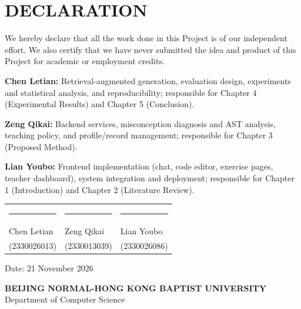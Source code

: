 \hypersetup{pageanchor=true}

\chapter*{DECLARATION}
{}

We hereby declare that all the work done in this Project is of our independent effort. We also certify that we have never submitted the idea and product of this Project for academic or employment credits.

\vspace{8mm}
\noindent
\textbf{Chen Letian:} Retrieval-augmented generation, evaluation design, experiments and statistical analysis, and reproducibility; responsible for Chapter 4 (Experimental Results) and Chapter 5 (Conclusion).\par
\vspace{3mm}
\noindent
\textbf{Zeng Qikai:} Backend services, misconception diagnosis and AST analysis, teaching policy, and profile/record management; responsible for Chapter 3 (Proposed Method).\par
\vspace{3mm}
\noindent
\textbf{Lian Youbo:} Frontend implementation (chat, code editor, exercise pages, teacher dashboard), system integration and deployment; responsible for Chapter 1 (Introduction) and Chapter 2 (Literature Review).\par

\vspace{22mm}
\noindent
\begin{tabular}{@{}p{}p{}p{}@{}}
\rule{4.8cm}{0.4pt} & \rule{4.8cm}{0.4pt} & \rule{4.8cm}{0.4pt}\\
Chen Letian & Zeng Qikai & Lian Youbo\\
(2330026013) & (2330013039) & (2330026086)
\end{tabular}

\vspace{10mm}
\noindent Date: 21 November 2026

\clearpage
{}
{}
\begin{center}
{\large\bfseries BEIJING NORMAL-HONG KONG BAPTIST UNIVERSITY}\\[2mm]
{\large Department of Computer Science}
\end{center}

